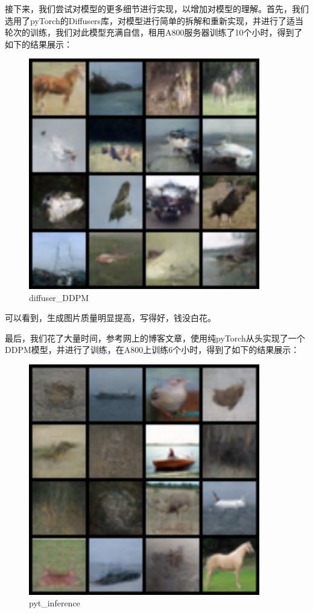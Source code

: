 \documentclass{ctexart}
\begin{document}
\noindent
接下来，我们尝试对模型的更多细节进行实现，以增加对模型的理解。首先，我们选用了pyTorch的Diffusers库，对模型进行简单的拆解和重新实现，并进行了适当轮次的训练，我们对此模型充满自信，租用A800服务器训练了10个小时，得到了如下的结果展示：
\begin{figure}[htb]
    \centering
    \includegraphics[width=0.9\textwidth]{sample_diffuser.png}
    \caption{diffuser_DDPM}
    \label{fig:cifar10_grid}
\end{figure}

\noindent
可以看到，生成图片质量明显提高，写得好，钱没白花。

\noindent
最后，我们花了大量时间，参考网上的博客文章，使用纯pyTorch从头实现了一个DDPM模型，并进行了训练，在A800上训练6个小时，得到了如下的结果展示：
\begin{figure}[htb]
    \centering
    \includegraphics[width=0.9\textwidth]{sample_pyt.png}
    \caption{pyt_inference}
    \label{fig:cifar10_grid}
\end{figure}
\end{document}
